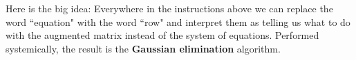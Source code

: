 Here is the big idea: 
Everywhere in the instructions above we can replace the word ``equation" with the word ``row" and interpret them as telling us what to do with the augmented matrix instead of the system of equations.
Performed systemically, the result is the {\bf Gaussian elimination} algorithm. 
%
%


